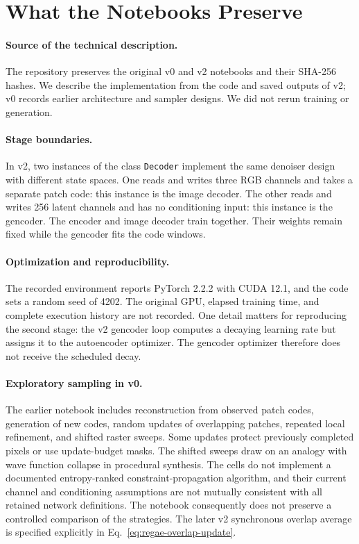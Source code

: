 \section{What the Notebooks Preserve}
\label{sec:archive}

\paragraph{Source of the technical description.}
The repository preserves the original v0 and v2 notebooks and their SHA-256 hashes. We describe the implementation from the code and saved outputs of v2; v0 records earlier architecture and sampler designs. We did not rerun training or generation.

\paragraph{Stage boundaries.}
In v2, two instances of the class \texttt{Decoder} implement the same denoiser design with different state spaces. One reads and writes three RGB channels and takes a separate patch code: this instance is the image decoder. The other reads and writes 256 latent channels and has no conditioning input: this instance is the gencoder. The encoder and image decoder train together. Their weights remain fixed while the gencoder fits the code windows.

\paragraph{Optimization and reproducibility.}
The recorded environment reports PyTorch 2.2.2 with CUDA 12.1, and the code sets a random seed of 4202. The original GPU, elapsed training time, and complete execution history are not recorded. One detail matters for reproducing the second stage: the v2 gencoder loop computes a decaying learning rate but assigns it to the autoencoder optimizer. The gencoder optimizer therefore does not receive the scheduled decay.

\paragraph{Exploratory sampling in v0.}
The earlier notebook includes reconstruction from observed patch codes, generation of new codes, random updates of overlapping patches, repeated local refinement, and shifted raster sweeps. Some updates protect previously completed pixels or use update-budget masks. The shifted sweeps draw on an analogy with wave function collapse in procedural synthesis. The cells do not implement a documented entropy-ranked constraint-propagation algorithm, and their current channel and conditioning assumptions are not mutually consistent with all retained network definitions. The notebook consequently does not preserve a controlled comparison of the strategies. The later v2 synchronous overlap average is specified explicitly in Eq.~\eqref{eq:regae-overlap-update}.

